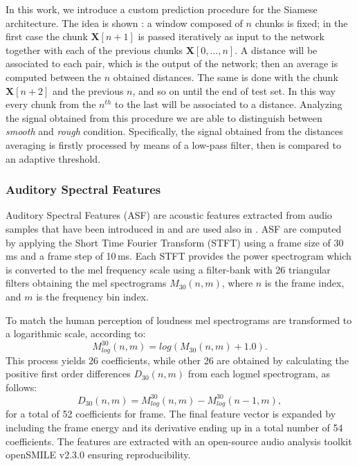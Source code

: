 In this work, we introduce a custom prediction procedure for the Siamese architecture. The idea is shown : a window composed of $n$ chunks is fixed; in the first case the chunk $\mathbf{X}[n+1]$ is passed iteratively as input to the network together with each of the previous chunks $\mathbf{X}[0,\dots,n]$. A distance will be associated to each pair, which is the output of the network; then an average is computed between the $n$ obtained distances. 
The same is done with the chunk $\mathbf{X}[n+2]$  and the previous $n$, and so on until the end of test set. In this way every chunk from the $n^{th}$ to the last will be associated to a distance. Analyzing the signal obtained from this procedure we are able to distinguish between \textit{smooth} and \textit{rough} condition. Specifically, the signal obtained from the distances averaging is firstly processed by means of a low-pass filter, then is compared to an adaptive threshold.



\subsubsection{Auditory Spectral Features}

Auditory Spectral Features (ASF) are acoustic features extracted from audio samples that have been introduced in \cite{eyben2010universal} and are used also in \cite{abdic2016detecting}. ASF are computed by applying the Short Time Fourier Transform (STFT) using a frame size of 30\,ms and a frame step of 10\,ms. Each STFT provides the power spectrogram which is converted to the mel frequency scale using a filter-bank with 26 triangular filters obtaining the mel spectrograms $M_{30}(n,m)$, where $n$ is the
frame index, and $m$ is the frequency bin index.

To match the human perception of loudness mel spectrograms are transformed to a logarithmic scale, according to:
\begin{equation}
M_{log}^{30}(n,m) = log(M_{30}(n,m) + 1.0).
\end{equation}
This process yields 26 coefficients, while other 26 are obtained by calculating the positive first order differences $D_{30}(n,m)$ from each logmel spectrogram, as follows:
\begin{equation}
D_{30}(n,m)  = M_{log}^{30}(n,m)-M_{log}^{30}(n-1,m),
\end{equation}
for a total of 52 coefficients for frame. The final feature vector is expanded by including the frame energy and its derivative ending up in a total number of 54 coefficients. %
The features are extracted with an open-source audio analysis toolkit openSMILE v2.3.0 \cite{Eyben13-RDI} ensuring reproducibility.

